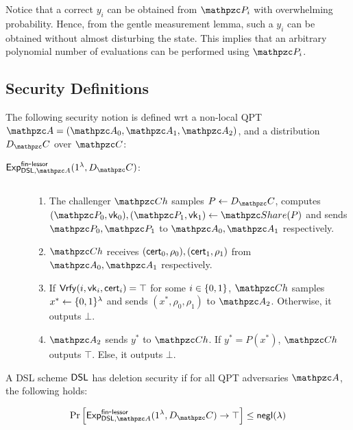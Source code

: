 \begin{remark}
Notice that a correct $y_i$ can be obtained from $\qP_i$ with
overwhelming probability. Hence, from the gentle measurement lemma,
such a $y_i$ can be obtained without almost disturbing the state.
This implies that an arbitrary polynomial number of evaluations can
be performed using $\qP_i$.
\end{remark}

\subsection{Security Definitions}

\begin{definition}
The following security notion is defined wrt a non-local QPT $\qA =
(\qA_0, \qA_1, \qA_2)$, and a distribution $D_\qC$ over $\qC$:

\begin{description}
\item [$\expb{\DSL, \qA}{fin}{lessor}(1^\secp, D_\qC)$:] $ $
\begin{enumerate}
\item The challenger $\qCh$ samples $P \leftarrow D_\qC$, computes
$(\qP_0, \vk_0), (\qP_1, \vk_1) \gets \Sh(P)$ and sends $\qP_0,
\qP_1$ to $\qA_0, \qA_1$ respectively.

\item $\qCh$ receives $(\mathsf{cert}_0, \rho_0), (\mathsf{cert}_1, \rho_1)$ from $\qA_0,
\qA_1$ respectively.

\item If $\mathsf{Vrfy}(i, \mathsf{vk}_i, \mathsf{cert}_i) = \top$ for some $i \in \{0,1\}$,
$\qCh$ samples $x^* \leftarrow \{0,1\}^\lambda$ and sends $(x^*, \rho_0, \rho_1)$ to
$\qA_2$. Otherwise, it outputs $\bot$.

\item $\qA_2$ sends $y^*$ to $\qCh$. If $y^* = P(x^*)$, $\qCh$
outputs $\top$. Else, it outputs $\bot$.

\end{enumerate}

\end{description}

A DSL scheme $\mathsf{DSL}$ has deletion security if for all QPT adversaries
$\qA$, the following holds:

$$\Pr\Big[\expb{\DSL, \qA}{fin}{lessor}(1^\secp, D_\qC) \ra \top\Big]
\le \negl(\secp)$$
\end{definition}

